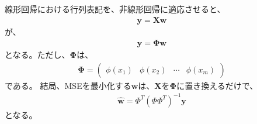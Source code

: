 \documentclass{ltjsarticle}
\begin{document}
線形回帰における行列表記を、非線形回帰に適応させると、
\begin{align}
  \boldsymbol{y} = \boldsymbol{X}\boldsymbol{w}
\end{align}
が、
\begin{align}
  \boldsymbol{y} = \boldsymbol{\Phi}\boldsymbol{w}
\end{align}
となる。ただし、$\boldsymbol{\Phi}$は、
\begin{align}
  \boldsymbol{\Phi} = 
  \begin{pmatrix}
    \phi(x_1) & \phi(x_2) & \cdots & \phi(x_m)
  \end{pmatrix}
\end{align}
である。
結局、MSEを最小化する$\boldsymbol{w}$は、$\boldsymbol{X}$を$\boldsymbol{\Phi}$に置き換えるだけで、
\begin{align}
  \hat{\boldsymbol{w}} = \Phi^T(\Phi\Phi^T)^{-1}\boldsymbol{y}
\end{align}
となる。

\newpage
\end{document}
